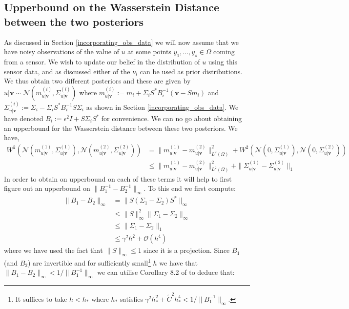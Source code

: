 \subsection{Upperbound on the Wasserstein Distance between the two posteriors}

As discussed in Section \textcolor{blue}{\ref{incorporating_obs_data}} we will now assume that we have noisy observations of the value of $u$ at some points $y_1,\dots,y_s\in\Omega$ coming from a sensor. We wish to update our belief in the distribution of $u$ using this sensor data, and as discussed either of the $\nu_i$ can be used as prior distributions. We thus obtain two different posteriors and these are given by $u|\mathbf{v}\sim\mathcal{N}(m^{(i)}_{u|\mathbf{v}},\Sigma^{(i)}_{u|\mathbf{v}})$ where $m^{(i)}_{u|\mathbf{v}}:=m_{i}+\Sigma_{i}S^{*}B_{i}^{-1}(\mathbf{v}-Sm_{i})$ and $\Sigma^{(i)}_{u|\mathbf{v}}:=\Sigma_{i}-\Sigma_{i}S^{*}B_{i}^{-1}S\Sigma_{i}$ as shown in Section \textcolor{blue}{\ref{incorporating_obs_data}}. We have denoted $B_{i}:=\epsilon^{2}I+S\Sigma_{i}S^{*}$ for convenience. We can no go about obtaining an upperbound for the Wasserstein distance between these two posteriors. We have,
\begin{align*}
    W^{2}\left(\mathcal{N}(m^{(1)}_{u|\mathbf{v}},\Sigma^{(1)}_{u|\mathbf{v}}),\mathcal{N}(m^{(2)}_{u|\mathbf{v}},\Sigma^{(2)}_{u|\mathbf{v}})\right)&=\|m^{(1)}_{u|\mathbf{v}}-m^{(2)}_{u|\mathbf{v}}\|_{L^{2}(\Omega)}^{2}+W^{2}\left(\mathcal{N}(0,\Sigma^{(1)}_{u|\mathbf{v}}),\mathcal{N}(0,\Sigma^{(2)}_{u|\mathbf{v}})\right) \\
    &\leq \|m^{(1)}_{u|\mathbf{v}}-m^{(2)}_{u|\mathbf{v}}\|_{L^{2}(\Omega)}^{2} + \|\Sigma^{(1)}_{u|\mathbf{v}}-\Sigma^{(2)}_{u|\mathbf{v}}\|_{1}
\end{align*}
In order to obtain on upperbound on each of these terms it will help to first figure out an upperbound on $\|B_{1}^{-1}-B_{2}^{-1}\|_{\infty}$. To this end we first compute:
\begin{align*}
    \|B_{1}-B_{2}\|_{\infty}&=\|S(\Sigma_{1}-\Sigma_{2})S^{*}\|_{\infty} \\
    &\leq\|S\|_{\infty}^{2}\|\Sigma_{1}-\Sigma_{2}\|_{\infty} \\
    &\leq\|\Sigma_{1}-\Sigma_{2}\|_{1} \\
    &\leq \gamma^{2}h^{2}+\mathcal{O}(h^4)
\end{align*}
where we have used the fact that $\|S\|_{\infty}\leq 1$ since it is a projection. Since $B_{1}$ (and $B_{2}$) are invertible and for sufficiently small\footnote{It suffices to take $h<h_{*}$ where $h_{*}$ satisfies $\gamma^{2}h_{*}^{2}+\tilde{C}^{2}h_{*}^{4}<1/\|B_{1}^{-1}\|_{\infty}$.} $h$ we have that $\|B_{1}-B_{2}\|_{\infty}<1/\|B_{1}^{-1}\|_{\infty}$ we can utilise Corollary 8.2 of \textcolor{blue}{\cite{gohberg2012basic}} to deduce that:
